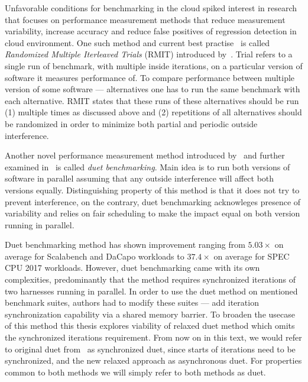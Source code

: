 Unfavorable conditions for benchmarking in the cloud spiked interest in research that focuses on performance measurement methods that reduce measurement variability, increase accuracy and reduce false positives of regression detection in cloud environment.
One such method and current best practise~\cite{laaber2019software} is called \emph{Randomized Multiple Iterleaved Trials} (RMIT) introduced by~\citet{abedi2017conducting}.
Trial refers to a single run of benchmark, with multiple inside iterations, on a particular version of software it measures performance of.
To compare performance between multiple version of some software --- alternatives one has to run the same benchmark with each alternative.
RMIT states that these runs of these alternatives should be run (1) multiple times as discussed above and (2) repetitions of all alternatives should be randomized in order to minimize both partial and periodic outside interference.

Another novel performance measurement method introduced by~\citet{bulej2019initial} and further examined in~\citet{bulej2020duet} is called \emph{duet benchmarking}.
Main idea is to run both versions of software in parallel assuming that any outside interference will affect both versions equally.
Distinguishing property of this method is that it does not try to prevent interference, on the contrary, duet benchmarking acknowleges presence of variability and relies on fair scheduling to make the impact equal on both version running in parallel.

Duet benchmarking method has shown improvement ranging from $5.03 \times$ on average for Scalabench and DaCapo workloads to $37.4 \times$ on average for SPEC CPU 2017 workloads.
However, duet benchmarking came with its own complexities, predominantly that the method requires synchronized iterations of two harnesses running in parallel.
In order to use the duet method on mentioned benchmark suites, authors had to modify these suites --- add iteration synchronization capability via a shared memory barrier.
To broaden the usecase of this method this thesis explores viability of relaxed duet method which omits the synchronized iterations requirement.
From now on in this text, we would refer to original duet from~\citet{bulej2020duet} as synchronized duet, since starts of iterations need to be synchronized, and the new relaxed approach as asynchronous duet.
For properties common to both methods we will simply refer to both methods as duet.

